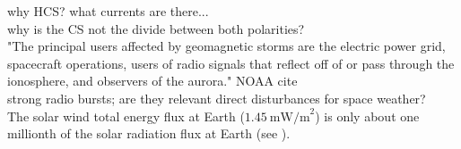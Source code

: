 

why HCS? what currents are there...\\
why is the CS not the divide between both polarities?\\

"The principal users affected by geomagnetic storms are the electric power grid, spacecraft operations, users of radio signals that reflect off of or pass through the ionosphere, and observers of the aurora." NOAA cite\\

strong radio bursts; are they relevant direct disturbances for space weather?\\

The solar wind total energy flux at Earth ($1.45~\text{mW/m}^2$) is only about one millionth of the solar radiation flux at Earth (see \citet[p.~153]{Schwenn1990}).\\

